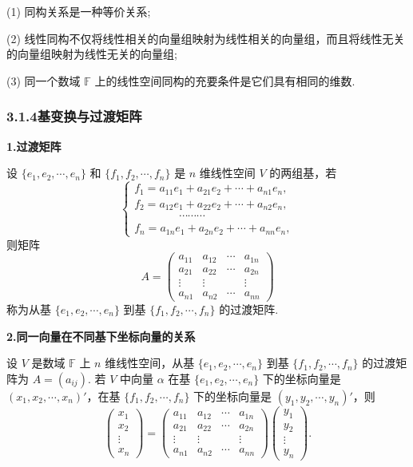 \documentclass[UTF8, 12pt, fontset=fandol, oneside]{ctexart}
\begin{document}
(1) 同构关系是一种等价关系;

(2) 线性同构不仅将线性相关的向量组映射为线性相关的向量组，而且将线性无关的向量组映射为线性无关的向量组;

(3) 同一个数域 $\mathbb{F}$ 上的线性空间同构的充要条件是它们具有相同的维数.

\subsubsection*{3.1.4\quad 基变换与过渡矩阵}

\noindent\textbf{1.\quad 过渡矩阵}

设 $\{e_1,e_2,\cdots,e_n\}$ 和 $\{f_1,f_2,\cdots,f_n\}$ 是 $n$ 维线性空间 $V$ 的两组基，若
\[
\left\{
\begin{array}{l}
f_1=a_{11}e_1+a_{21}e_2+\cdots+a_{n1}e_n,\\
f_2=a_{12}e_1+a_{22}e_2+\cdots+a_{n2}e_n,\\
\hspace{4em}\cdots\cdots\cdots\\
f_n=a_{1n}e_1+a_{2n}e_2+\cdots+a_{nn}e_n,
\end{array}
\right.
\]
则矩阵
\[
A=
\begin{pmatrix}
a_{11} & a_{12} & \cdots & a_{1n}\\
a_{21} & a_{22} & \cdots & a_{2n}\\
\vdots & \vdots &        & \vdots\\
a_{n1} & a_{n2} & \cdots & a_{nn}
\end{pmatrix}
\]
称为从基 $\{e_1,e_2,\cdots,e_n\}$ 到基 $\{f_1,f_2,\cdots,f_n\}$ 的过渡矩阵.

\noindent\textbf{2.\quad 同一向量在不同基下坐标向量的关系}

设 $V$ 是数域 $\mathbb{F}$ 上 $n$ 维线性空间，从基 $\{e_1,e_2,\cdots,e_n\}$ 到基 $\{f_1,f_2,\cdots,f_n\}$ 的过渡矩阵为 $A=(a_{ij})$. 若 $V$ 中向量 $\alpha$ 在基 $\{e_1,e_2,\cdots,e_n\}$ 下的坐标向量是 $(x_1,x_2,\cdots,x_n)'$，在基 $\{f_1,f_2,\cdots,f_n\}$ 下的坐标向量是 $(y_1,y_2,\cdots,y_n)'$，则
\[
\begin{pmatrix}
x_1\\
x_2\\
\vdots\\
x_n
\end{pmatrix}
=
\begin{pmatrix}
a_{11} & a_{12} & \cdots & a_{1n}\\
a_{21} & a_{22} & \cdots & a_{2n}\\
\vdots & \vdots &        & \vdots\\
a_{n1} & a_{n2} & \cdots & a_{nn}
\end{pmatrix}
\begin{pmatrix}
y_1\\
y_2\\
\vdots\\
y_n
\end{pmatrix}.
\]
\end{document}
